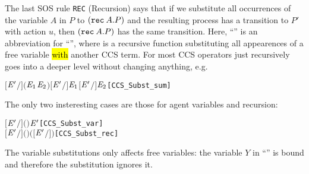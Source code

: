 The last SOS rule \texttt{REC} (Recursion)
 says that if we substitute all occurrences of the variable $A$ in $P$ to
$({\tt rec}\: A . P)$ and the resulting process has a transition to $P'$
with action $u$, then $({\tt rec}\: A . P)$ has the same
transition. Here, ``'' is an abbreviation
for ``'', where  is a
recursive function substituting all appearences of a free variable \hl{with} another CCS term.
For most CCS operators  just recursively goes into a deeper
level without changing anything, e.g.
\begin{alltt}
\HOLTokenTurnstile{} \ensuremath{[}\ensuremath{\HOLFreeVar{E}\sp{\prime}}\ensuremath{/}\ensuremath{]} \ensuremath{(}\ensuremath{\HOLFreeVar{E}\sb{\mathrm{1}}} \HOLSymConst{\ensuremath{+}} \ensuremath{\HOLFreeVar{E}\sb{\mathrm{2}}}\ensuremath{)} \HOLSymConst{\ensuremath{=}} \ensuremath{[}\ensuremath{\HOLFreeVar{E}\sp{\prime}}\ensuremath{/}\ensuremath{]} \ensuremath{\HOLFreeVar{E}\sb{\mathrm{1}}} \HOLSymConst{\ensuremath{+}} \ensuremath{[}\ensuremath{\HOLFreeVar{E}\sp{\prime}}\ensuremath{/}\ensuremath{]} \ensuremath{\HOLFreeVar{E}\sb{\mathrm{2}}}\hfill{[CCS_Subst_sum]}
\end{alltt}
The only two insteresting cases are those for  agent variables and recursion:
\begin{alltt}
\HOLTokenTurnstile{} \ensuremath{[}\ensuremath{\HOLFreeVar{E}\sp{\prime}}\ensuremath{/}\ensuremath{]} \ensuremath{(} \ensuremath{)} \HOLSymConst{\ensuremath{=}}   \HOLSymConst{\ensuremath{=}}   \ensuremath{\HOLFreeVar{E}\sp{\prime}}   \hfill{[CCS_Subst_var]}
\HOLTokenTurnstile{} \ensuremath{[}\ensuremath{\HOLFreeVar{E}\sp{\prime}}\ensuremath{/}\ensuremath{]} \ensuremath{(}  \ensuremath{)} \HOLSymConst{\ensuremath{=}}   \HOLSymConst{\ensuremath{=}}         \ensuremath{(}\ensuremath{[}\ensuremath{\HOLFreeVar{E}\sp{\prime}}\ensuremath{/}\ensuremath{]} \ensuremath{)}\hfill{[CCS_Subst_rec]}
\end{alltt}
The variable substitutions only affects free
variables: the variable $Y$ in ``'' is
bound and therefore the substitution ignores it.

